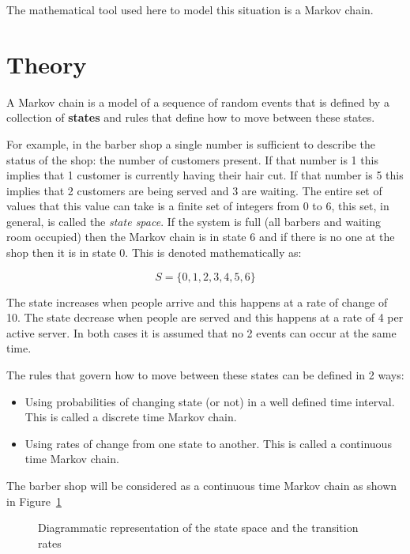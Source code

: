 The mathematical tool used here to model this situation is a Markov chain.

\section{Theory}\label{sec:markov_chains_theory}

A Markov chain is a model of a sequence of random events that is defined by a
collection of \textbf{states} and rules that define how to move between these
states.

For example, in the barber shop a single number is sufficient to describe the
status of the shop: the number of customers present.
If that number is 1 this implies that 1 customer is
currently having their hair cut. If that number is 5 this implies that 2
customers are being served and 3 are waiting. The entire set of values that this value can take
is
a finite set of integers from 0 to 6, this set, in general, is called the \textit{state space}.
If the system is full (all barbers
and waiting room occupied) then the Markov chain is in state 6 and if there is no one at the
shop then it is in state 0. This is denoted mathematically as:

\begin{equation}
    S = \{0, 1, 2, 3, 4, 5, 6\}
    \label{eqn:barber_shop_state_space}
\end{equation}

The state increases when people arrive and this happens at a rate of change of
10. The state decrease when people are served and this happens at a rate of 4
per active server. In both cases it is assumed that no 2 events can occur at
the same time.

The rules that govern how to move between these states can be defined in 2
ways:

\begin{itemize}
    \item Using probabilities of changing state (or not) in a well defined time
        interval. This is called a discrete time Markov chain.
    \item Using rates of change from one state to another. This is called a
        continuous time Markov chain.
\end{itemize}

The barber shop will be considered as a continuous time Markov chain as shown
in Figure~\ref{fig:barber-shop-continuous-markov-process}

\begin{figure}[!hbtp]
    \begin{center}
    
    \end{center}
    \caption{Diagrammatic representation of the state space and the transition
    rates}
    \label{fig:barber-shop-continuous-markov-process}
\end{figure}

